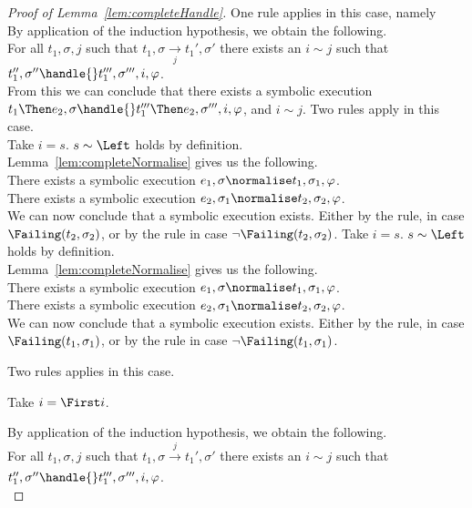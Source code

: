 \begin{proof}[Proof of Lemma~\ref{lem:completeHandle}]
  {
  One rule applies in this case, namely \\

  By application of the induction hypothesis, we obtain the following.\\
  For all $t_1,\sigma,j$ such that $t_1,\sigma\xrightarrow[j]{}t_1',\sigma'$ there exists an $i\sim j$ such that $t_1'',\sigma''\handle{}t_1''',\sigma''',i,\phi$.\\
  From this we can conclude that there exists a symbolic execution $t_1\Then e_2,\sigma\handle{} t_1'''\Then e_2,\sigma''',i,\phi$, and $i\sim j$.
  }
  {
  Two rules apply in this case.\\
    {
      Take $i=s$. $s\sim \Left$ holds by definition.\\
      Lemma~\ref{lem:completeNormalise} gives us the following.\\
      There exists a symbolic execution $e_1,\sigma\normalise t_1,\sigma_1,\phi$.\\
      There exists a symbolic execution $e_2,\sigma_1\normalise t_2,\sigma_2,\phi$.\\

      We can now conclude that a symbolic execution exists.
      Either by the  rule, in case $\Failing(t_2,\sigma_2)$, or by the  rule in case $\neg\Failing(t_2,\sigma_2)$.
    }
    {
    Take $i=s$. $s\sim \Left$ holds by definition.\\
    Lemma~\ref{lem:completeNormalise} gives us the following.\\
    There exists a symbolic execution $e_1,\sigma\normalise t_1,\sigma_1,\phi$.\\
    There exists a symbolic execution $e_2,\sigma_1\normalise t_2,\sigma_2,\phi$.\\

    We can now conclude that a symbolic execution exists.
    Either by the  rule, in case $\Failing(t_1,\sigma_1)$, or by the  rule in case $\neg\Failing(t_1,\sigma_1)$.
    }
  }
    {
    Two rules applies in this case.\\
    {
    Take $i=\First i$.

    By application of the induction hypothesis, we obtain the following.\\
    For all $t_1,\sigma,j$ such that $t_1,\sigma\xrightarrow[]{j}t_1',\sigma'$ there exists an $i\sim j$ such that $t_1'',\sigma''\handle{}t_1''',\sigma''',i,\phi$.\\

}}
\end{proof}
